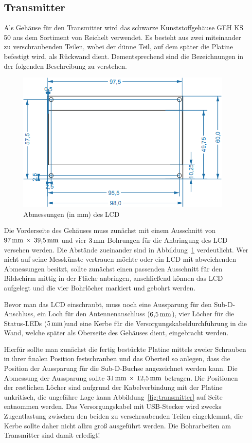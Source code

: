 \documentclass[pdftex, parskip, numbers=noenddot, toc=listof]{scrbook}
\begin{document}
	\subsection{Transmitter}
	Als Gehäuse für den Transmitter wird das schwarze Kunststoffgehäuse GEH KS 50 aus dem Sortiment von Reichelt verwendet. Es besteht aus zwei miteinander zu verschraubenden Teilen, wobei der dünne Teil, auf dem später die Platine befestigt wird, als Rückwand dient. Dementsprechend sind die Bezeichnungen in der folgenden Beschreibung zu verstehen.

	\begin{figure}
		\centering
		\includegraphics[]{bilder/lcddimensions}
		\caption{Abmessungen (in mm) des LCD}
		\label{fig:lcddimensions}
	\end{figure}

	Die Vorderseite des Gehäuses muss zunächst mit einem Ausschnitt von $\unit[97]{mm}\,\times\,\unit[39{,}5]{mm}$ und vier $\unit[3]{mm}$-Bohrungen für die Anbringung des LCD versehen werden. Die Abstände zueinander sind in Abbildung~\ref{fig:lcddimensions} verdeutlicht. Wer nicht auf seine Messkünste vertrauen möchte oder ein LCD mit abweichenden Abmessungen besitzt, sollte zunächst einen passenden Ausschnitt für den Bildschirm mittig in der Fläche anbringen, anschließend können das LCD aufgelegt und die vier Bohrlöcher markiert und gebohrt werden.

	Bevor man das LCD einschraubt, muss noch eine Aussparung für den Sub-D-Anschluss, ein Loch für den Antennenanschluss ($\unit[6{,}5]{mm}$), vier Löcher für die Status-LEDs ($\unit[5]{mm}$)und eine Kerbe für die Versorgungskabeldurchführung in die Wand, welche später als Oberseite des Gehäuses dient, eingebracht werden.

	Hierfür sollte man zunächst die fertig bestückte Platine mittels zweier Schrauben in ihrer finalen Position festschrauben und das Oberteil so anlegen, dass die Position der Aussparung für die Sub-D-Buchse angezeichnet werden kann. Die Abmessung der Aussparung sollte $\unit[31]{mm}\,\times\,\unit[12{,}5]{mm}$ betragen. Die Positionen der restlichen Löcher sind aufgrund der Kabelverbindung mit der Platine unkritisch, die ungefähre Lage kann Abbildung~\ref{fig:transmitter} auf Seite \pageref{fig:transmitter} entnommen werden. Das Versorgungskabel mit USB-Stecker wird zwecks Zugentlastung zwischen den beiden zu verschraubenden Teilen eingeklemmt, die Kerbe sollte daher nicht allzu groß ausgeführt werden. Die Bohrarbeiten am Transmitter sind damit erledigt!
\end{document}
